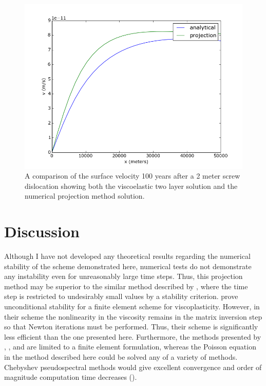\documentclass[a4paper]{article}
\begin{document}
\begin{figure}[h!]
  \caption{A comparison of the surface velocity 100 years after a 2 meter screw dislocation showing both the viscoelastic two layer solution and the numerical projection method solution.}
  \centering
    \includegraphics[width=1.0\textwidth]{velocity_comparison.png}
\end{figure}
\clearpage
\section{Discussion}
Although I have not developed any theoretical results regarding the numerical stability of the scheme demonstrated here, numerical tests do not demonstrate any 
instability even for unreasonably large time steps. Thus, this projection method may be superior to the similar method described by \citet{Zienkiewicz1974},
where the time step is restricted to undesirably small values by a stability criterion.
\citet{Hughes1978} prove unconditional stability for a finite element scheme for viscoplasticity. However, in their scheme the nonlinearity in the 
viscosity remains in the matrix inversion step so that Newton iterations must be performed. Thus, their scheme is significantly less efficient than the
one presented here. Furthermore, the methods presented by \citet{Hughes1978}, \citet{Zienkiewicz1974}, and \citet{Melosh1980} are limited to a 
finite element formulation, whereas the Poisson equation in the method described here could be solved any of a variety of methods. Chebyshev pseudospectral
methods would give excellent convergence and order of magnitude computation time decreases (\citep{Trefethen2000}). 
\end{document}
